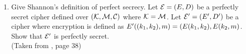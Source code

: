 \begin{enumerate}[label=\textbf{Exercise \thesection.\arabic*}, wide=0pt]
	\item Give Shannon's definition of perfect secrecy. Let ${\cal E}=(E, D)$ be a perfectly secret cipher defined over $({\cal K},{\cal M},{\cal C})$ where ${\cal K}={\cal M}$. Let ${\cal E}' = (E',D')$ be a cipher where encryption is defined as $E'((k_1,k_2), m) = (E(k_1,k_2), E(k_2,m)$. Show that ${\cal E}'$ is perfectly secret. \\  
	(Taken from \cite{BonehShoupBook}, page 38)
\end{enumerate}